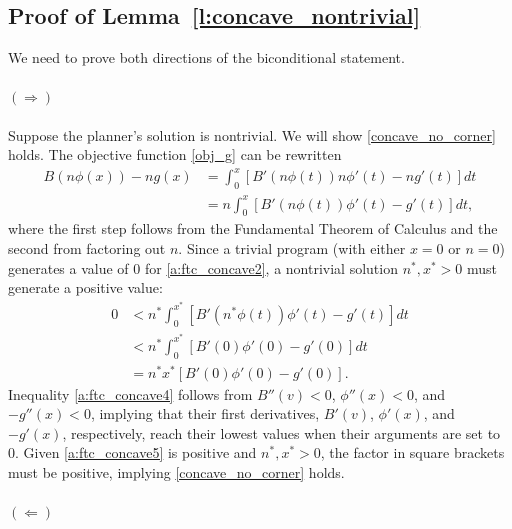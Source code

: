 \documentclass[12pt]{article}
\newcommand{\efficacy}{\phi}
\newcommand{\general}{g}
\newcommand{\benefit}{B}
\begin{document}

\subsection*{Proof of Lemma~\ref{l:concave_nontrivial}}

We need to prove both directions of the biconditional statement.

\paragraph{$(\Longrightarrow)$} 

Suppose the planner's solution is nontrivial. We will show
\eqref{concave_no_corner} holds. The objective function \eqref{obj_g}
can be rewritten
\begin{align}
\benefit(n\efficacy(x)) - n \general(x) & = \int_0^x \left[ \benefit'(n\efficacy(t))n \efficacy'(t) - n \general'(t) \right] dt  \label{a:ftc_concave1} \\
& = n \int_0^x \left[ \benefit'(n\efficacy(t)) \efficacy'(t) - \general'(t) \right] dt, \label{a:ftc_concave2}
\end{align} 
where the first step follows from the Fundamental Theorem of Calculus
and the second from factoring out $n$. Since a trivial program (with
either $x = 0$ or $n = 0$) generates a value of 0 for
\eqref{a:ftc_concave2}, a nontrivial solution $n^*, x^* > 0$ must
generate a positive value:
\begin{align}
0 & < n^* \int_0^{x^*} \left[ \benefit'(n^*\efficacy(t)) \efficacy'(t) - \general'(t) \right] dt \label{a:ftc_concave3} \\
& < n^* \int_0^{x^*} \left[ \benefit'(0) \efficacy'(0) - \general'(0) \right] dt \label{a:ftc_concave4} \\
& = n^* x^* \left[ \benefit'(0) \efficacy'(0) - \general'(0) \right]. \label{a:ftc_concave5}
\end{align}
Inequality \eqref{a:ftc_concave4} follows from $\benefit''(v) < 0$,
$\efficacy''(x) < 0$, and $-\general''(x) < 0$, implying that their
first derivatives, $\benefit'(v)$, $\efficacy'(x)$, and
$-\general'(x)$, respectively, reach their lowest values when their
arguments are set to 0. Given \eqref{a:ftc_concave5} is positive and
$n^*, x^* > 0$, the factor in square brackets must be positive,
implying \eqref{concave_no_corner} holds.

\paragraph{$(\Longleftarrow)$}
\end{document}
